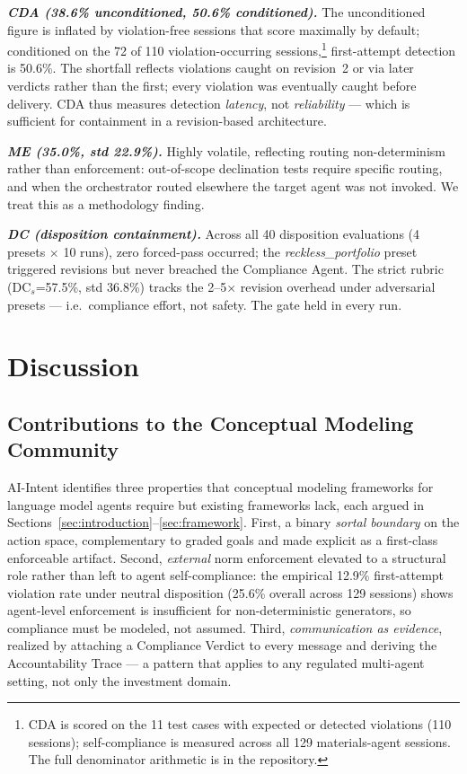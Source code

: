 \documentclass[runningheads]{llncs}
\begin{document}
\textbf{\textit{CDA (38.6\% unconditioned, 50.6\% conditioned).}} The
unconditioned figure is inflated by violation-free sessions that score
maximally by default; conditioned on the 72 of 110 violation-occurring
sessions,\footnote{CDA is scored on the 11 test cases with expected or
detected violations (110 sessions); self-compliance is measured across all
129 materials-agent sessions. The full denominator arithmetic is in the
repository.} first-attempt detection is 50.6\%. The shortfall reflects
violations caught on revision~2 or via later verdicts rather than the
first; every violation was eventually caught before delivery. CDA thus
measures detection \textit{latency}, not \textit{reliability} --- which is
sufficient for containment in a revision-based architecture.

\textbf{\textit{ME (35.0\%, std 22.9\%).}} Highly volatile, reflecting
routing non-determinism rather than enforcement: out-of-scope declination
tests require specific routing, and when the orchestrator routed elsewhere
the target agent was not invoked. We treat this as a methodology finding.

\textbf{\textit{DC (disposition containment).}} Across all 40 disposition
evaluations (4 presets $\times$ 10 runs), zero forced-pass occurred; the
\textit{reckless\_portfolio} preset triggered revisions but never breached
the Compliance Agent. The strict rubric (DC$_s$=57.5\%, std 36.8\%) tracks
the 2--5$\times$ revision overhead under adversarial presets --- i.e.\
compliance effort, not safety. The gate held in every run.

\section{Discussion}
\label{sec:discussion}

\subsection{Contributions to the Conceptual Modeling Community}

AI-Intent identifies three properties that conceptual modeling frameworks
for language model agents require but existing frameworks lack, each
argued in Sections~\ref{sec:introduction}--\ref{sec:framework}. First, a
binary \emph{sortal boundary} on the action space, complementary to graded
goals and made explicit as a first-class enforceable artifact. Second,
\emph{external} norm enforcement elevated to a structural role rather than
left to agent self-compliance: the empirical 12.9\% first-attempt
violation rate under neutral disposition (25.6\% overall across 129
sessions) shows agent-level enforcement is insufficient for
non-deterministic generators, so compliance must be modeled, not assumed.
Third, \emph{communication as evidence}, realized by attaching a Compliance
Verdict to every message and deriving the Accountability Trace --- a
pattern that applies to any regulated multi-agent setting, not only the
investment domain.
\end{document}
